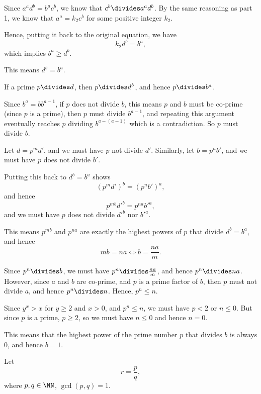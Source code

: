 \begin{enumerate}
          Since \(a^a d^b = b^a c^b\), we know that \(c^b \divides a^a d^b\). By the same reasoning as part 1, we know that \(a^a = k_2 c^b\) for some positive integer \(k_2\).

          Hence, putting it back to the original equation, we have
          \[
              k_2 d^b = b^a,
          \]
          which implies \(b^a \geq d^b\).

          This means \(d^b = b^a\).

          If a prime \(p \divides d\), then \(p \divides d^b\), and hence \(p \divides b^a\).

          Since \(b^a = b b^{a - 1}\), if \(p\) does not divide \(b\), this means \(p\) and \(b\) must be co-prime (since \(p\) is a prime), then \(p\) must divide \(b^{a - 1}\), and repeating this argument eventually reaches \(p\) dividing \(b^{a - (a - 1)}\) which is a contradiction. So \(p\) must divide \(b\).

          Let \(d = p^m d'\), and we must have \(p\) not divide \(d'\). Similarly, let \(b = p^n b'\), and we must have \(p\) does not divide \(b'\).

          Putting this back to \(d^b = b^a\) shows
          \[
              (p^m d')^b = (p^n b')^a,
          \]
          and hence
          \[
              p^{mb} d'^b = p^{na} b'^a,
          \]
          and we must have \(p\) does not divide \(d'^b\) nor \(b'^a\).

          This means \(p^{mb}\) and \(p^{na}\) are exactly the highest powers of \(p\) that divide \(d^b = b^a\), and hence
          \[
              mb = na \iff b = \frac{na}{m}.
          \]

          Since \(p^n \divides b\), we must have \(p^n \divides \frac{na}{m}\), and hence \(p^n \divides na\). However, since \(a\) and \(b\) are co-prime, and \(p\) is a prime factor of \(b\), then \(p\) must not divide \(a\), and hence \(p^n \divides n\). Hence, \(p^n \leq n\).

          Since \(y^x > x\) for \(y \geq 2\) and \(x > 0\), and \(p^n \leq n\), we must have \(p < 2\) or \(n \leq 0\). But since \(p\) is a prime, \(p \geq 2\), so we must have \(n \leq 0\) and hence \(n = 0\).

          This means that the highest power of the prime number \(p\) that divides \(b\) is always \(0\), and hence \(b = 1\).

          Let
          \[
              r = \frac{p}{q},
          \]
          where \(p, q \in \NN\), \(\gcd(p, q) = 1\).


\end{enumerate}
